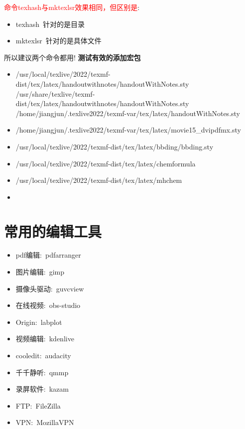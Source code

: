 \documentclass[10pt, oneside, a4paper]{article}      %
\begin{document}
\begin{itemize}
\textcolor{red}{命令\textrm{texhash}与\textrm{mktexlsr}效果相同，但区别是}:
\begin{itemize}
	\item \textrm{texhash}~针对的是目录
	\item \textrm{mktexlsr}~针对的是具体文件
\end{itemize}
所以建议两个命令都用!
\vskip 10pt
\textbf{测试有效的添加宏包}
\begin{itemize}
	\item   \textrm{/usr/local/texlive/2022/texmf-dist/tex/latex/handoutwithnotes/handoutWithNotes.sty}\\
		\textrm{/usr/share/texlive/texmf-dist/tex/latex/handoutwithnotes/handoutWithNotes.sty}\\
		\textrm{/home/jiangjun/.texlive2022/texmf-var/tex/latex/handoutWithNotes.sty}
	\item \textrm{/home/jiangjun/.texlive2022/texmf-var/tex/latex/movie15\_dvipdfmx.sty}
	\item \textrm{/usr/local/texlive/2022/texmf-dist/tex/latex/bbding/bbding.sty}
	\item \textrm{/usr/local/texlive/2022/texmf-dist/tex/latex/chemformula}
	\item \textrm{/usr/local/texlive/2022/texmf-dist/tex/latex/mhchem}
	\item \textrm{}
\end{itemize}
\vskip 10pt
\end{itemize}

\section{常用的编辑工具}
\begin{itemize}
	\item \textrm{pdf}编辑:~\textrm{pdfarranger}
	\item 图片编辑:~\textrm{gimp}
	\item 摄像头驱动:~\textrm{guvcview}
	\item 在线视频:~\textrm{obs-studio}
	\item \textrm{Origin}:~\textrm{labplot}
	\item \textrm{视频编辑}:~\textrm{kdenlive}
	\item \textrm{cooledit}:~\textrm{audacity}
	\item \textrm{千千静听}:~\textrm{qmmp}
	\item \textrm{录屏软件}:~\textrm{kazam}
	\item \textrm{FTP}:~\textrm{FileZilla}
	\item \textrm{VPN}:~\textrm{MozillaVPN}
\end{itemize}
\end{document}
